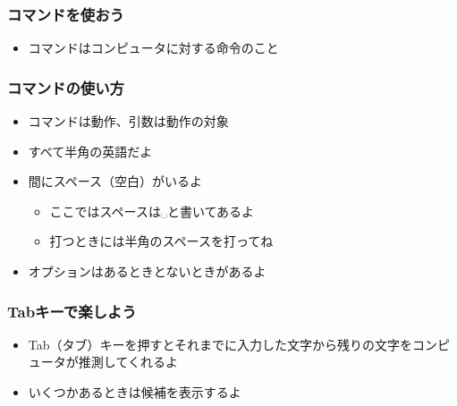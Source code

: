 \begin{frame}
    \frametitle{コマンドを使おう}
    \begin{itemize}
        \item コマンドはコンピュータに対する命令のこと
    \end{itemize}
    \begin{figure}[h]
        \centering
        
    \end{figure}
\end{frame}

\begin{frame}
    \frametitle{コマンドの使い方}
    \begin{figure}[h]
        \centering
        
    \end{figure}
    \begin{itemize}
        \item コマンドは動作、引数は動作の対象
        \item すべて半角の英語だよ
        \item 間にスペース（空白）がいるよ
            \begin{itemize}
                \item ここではスペースは␣と書いてあるよ
                \item 打つときには半角のスペースを打ってね
            \end{itemize}
        \item オプションはあるときとないときがあるよ
    \end{itemize}
\end{frame}

\begin{frame}
    \frametitle{Tabキーで楽しよう}
    \begin{itemize}
        \item Tab（タブ）キーを押すとそれまでに入力した文字から残りの文字をコンピュータが推測してくれるよ
        \item いくつかあるときは候補を表示するよ
    \end{itemize}
    \begin{figure}[h]
        \centering
        
    \end{figure}
\end{frame}

